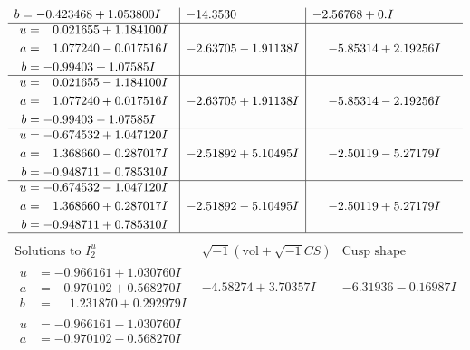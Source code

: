 \documentclass[1p]{elsarticle_modified}
\theoremstyle{definition}
\newcommand{\I}{\sqrt{-1}}
\begin{document}
$$\begin{array}{c|c|c}
\begin{aligned}
b &= -0.423468 + 1.053800 I\end{aligned}
 & -14.3530\phantom{ +0.000000I} & -2.56768 + 0. I\phantom{ +0.000000I} \\ \hline\begin{aligned}
u &= \phantom{-}0.021655 + 1.184100 I \\
a &= \phantom{-}1.077240 - 0.017516 I \\
b &= -0.99403 + 1.07585 I\end{aligned}
 & -2.63705 - 1.91138 I & -5.85314 + 2.19256 I \\ \hline\begin{aligned}
u &= \phantom{-}0.021655 - 1.184100 I \\
a &= \phantom{-}1.077240 + 0.017516 I \\
b &= -0.99403 - 1.07585 I\end{aligned}
 & -2.63705 + 1.91138 I & -5.85314 - 2.19256 I \\ \hline\begin{aligned}
u &= -0.674532 + 1.047120 I \\
a &= \phantom{-}1.368660 - 0.287017 I \\
b &= -0.948711 - 0.785310 I\end{aligned}
 & -2.51892 + 5.10495 I & -2.50119 - 5.27179 I \\ \hline\begin{aligned}
u &= -0.674532 - 1.047120 I \\
a &= \phantom{-}1.368660 + 0.287017 I \\
b &= -0.948711 + 0.785310 I\end{aligned}
 & -2.51892 - 5.10495 I & -2.50119 + 5.27179 I\\
 \hline 
 \end{array}$$\newpage$$\begin{array}{c|c|c}  
\text{Solutions to }I^u_{2}& \I (\text{vol} + \sqrt{-1}CS) & \text{Cusp shape}\\
 \hline 
\begin{aligned}
u &= -0.966161 + 1.030760 I \\
a &= -0.970102 + 0.568270 I \\
b &= \phantom{-}1.231870 + 0.292979 I\end{aligned}
 & -4.58274 + 3.70357 I & -6.31936 - 0.16987 I \\ \hline\begin{aligned}
u &= -0.966161 - 1.030760 I \\
a &= -0.970102 - 0.568270 I \\

\end{aligned}
\end{array}$$
\end{document}
